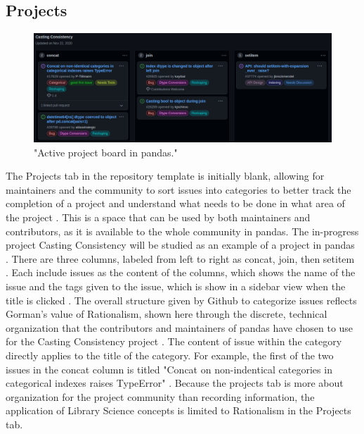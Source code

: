 \subsection{Projects}

\begin{figure}[hbt!]
\begin{center}
\includegraphics[width=.8\textwidth]{./images/project_board.png}
\caption{"Active project board in pandas."}
\vspace{0in}
\end{center}
\end{figure}

The Projects tab in the repository template is initially blank, allowing for maintainers and the community to sort issues into categories to better track the completion of a project and understand what needs to be done in what area of the project \cite{pandasrepo}. This is a space that can be used by both maintainers and contributors, as it is available to the whole community in pandas. The in-progress project Casting Consistency will be studied as an example of a project in pandas \cite{pandasrepo}. There are three columns, labeled from left to right as concat, join, then setitem \cite{pandasrepo}. Each include issues as the content of the columns, which shows the name of the issue and the tags given to the issue, which is show in a sidebar view when the title is clicked \cite{pandasrepo}. The overall structure given by Github to categorize issues reflects Gorman's value of Rationalism, shown here through the discrete, technical organization that the contributors and maintainers of pandas have chosen to use for the Casting Consistency project \cite{gorman2000values} \cite{pandasrepo}. The content of issue within the category directly applies to the title of the category. For example, the first of the two issues in the concat column is titled "Concat on non-indentical categories in categorical indexes raises TypeError" \cite{pandasrepo}. Because the projects tab is more about organization for the project community than recording information, the application of Library Science concepts is limited to Rationalism in the Projects tab. 

